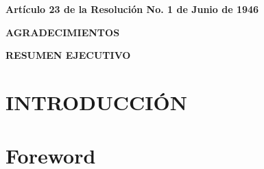 \documentclass{report}
\begin{document}
    
    
    
    \setcounter{page}{4}
	\begin{flushleft}
		 \label{artículo}
		\vspace*{2cm}
		\large{\textbf{Artículo 23 de la Resolución No. 1 de Junio de 1946}}
	\end{flushleft}
	
	\clearpage

	\begin{center}
		 \label{glads}
		\large{\textbf{AGRADECIMIENTOS}}
	\end{center}
	
	\clearpage
    
    \begin{center}
		 \label{resumenejecutivo}
		\large{\textbf{RESUMEN EJECUTIVO}}
	\end{center}
	
	\clearpage

    \setlength{\cftbeforetoctitleskip}{-0.3cm}
	\renewcommand{\cfttoctitlefont}{\large}
	\renewcommand{\contentsname}{\textbf{CONTENIDO}}
	
	\tableofcontents 
	\newpage
	\renewcommand\cftloftitlefont{\large}
	\renewcommand{\listfigurename}{\textbf{ÍNDICE DE FIGURAS}}
	{%
		\let\oldnumberline\numberline%
		\renewcommand{\numberline}{\figurename~\oldnumberline}%
		\listoffigures%
	}
	\newpage
	\renewcommand\cftlottitlefont{\large}
	\renewcommand{\listtablename}{\textbf{ÍNDICE DE TABLAS}}
	{%
		\let\oldnumberline\numberline%
		\renewcommand{\numberline}{\tablename~\oldnumberline}%
		\listoftables%
	}
	\newpage
	\chapternumberfont{\huge}
	\chaptertitlefont{\large}
	\chapter{INTRODUCCIÓN}
	
	
	\chapter*{Foreword} 
\end{document}
